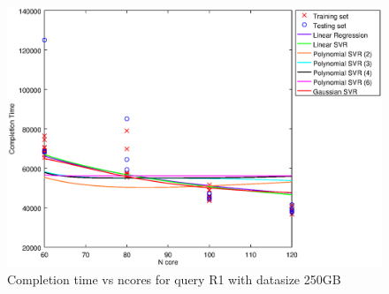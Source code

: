 
\begin {figure}[hbtp]
\centering
\includegraphics[width=\textwidth]{output/R1_250_1_OVER_NCORES/plot_R1_250.eps}
\caption{Completion time vs ncores for query R1 with datasize 250GB}
\label{fig:all_nonlinear_R1_250}
\end {figure}
